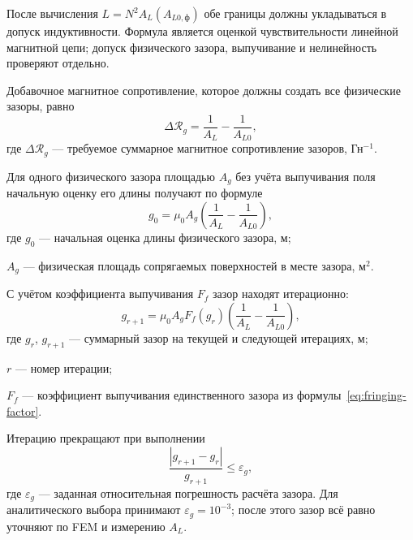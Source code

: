\documentclass[14pt,a4paper]{extarticle}
\begin{document}
После вычисления $L=N^2A_L(A_{L0,\text{ф}})$ обе границы должны
укладываться в допуск индуктивности. Формула является оценкой
чувствительности линейной магнитной цепи; допуск физического зазора,
выпучивание и нелинейность проверяют отдельно.

Добавочное магнитное сопротивление, которое должны создать все физические
зазоры, равно
\begin{equation}
 \Delta\mathcal R_g=
 \frac{1}{A_L}-\frac{1}{A_{L0}},
 \label{eq:gap-required-reluctance}
\end{equation}
где $\Delta\mathcal R_g$ --- требуемое суммарное магнитное сопротивление
зазоров, Гн$^{-1}$.

Для одного физического зазора площадью $A_g$ без учёта выпучивания поля
начальную оценку его длины получают по формуле
\begin{equation}
 g_0=\mu_0 A_g
 \left(
 \frac{1}{A_L}-\frac{1}{A_{L0}}
 \right),
 \label{eq:gap-ideal}
\end{equation}
где $g_0$ --- начальная оценка длины физического зазора, м;\par\noindent
$A_g$ --- физическая площадь сопрягаемых поверхностей в месте зазора,
м$^2$.

С учётом коэффициента выпучивания $F_f$ зазор находят
итерационно:
\begin{equation}
 g_{r+1}=\mu_0 A_g F_f(g_r)
 \left(
 \frac{1}{A_L}-\frac{1}{A_{L0}}
 \right),
 \label{eq:gap-fringing}
\end{equation}
где $g_r$, $g_{r+1}$ --- суммарный зазор на текущей и следующей
итерациях, м;\par\noindent
$r$ --- номер итерации;\par\noindent
$F_f$ --- коэффициент выпучивания единственного зазора из
формулы~\eqref{eq:fringing-factor}.

Итерацию прекращают при выполнении
\begin{equation}
 \frac{\left|g_{r+1}-g_r\right|}{g_{r+1}}
 \leq\varepsilon_g,
 \label{eq:gap-iteration-stop}
\end{equation}
где $\varepsilon_g$ --- заданная относительная погрешность расчёта
зазора. Для аналитического выбора принимают
$\varepsilon_g=10^{-3}$; после этого зазор всё равно уточняют по FEM и
измерению $A_L$.
\end{document}
